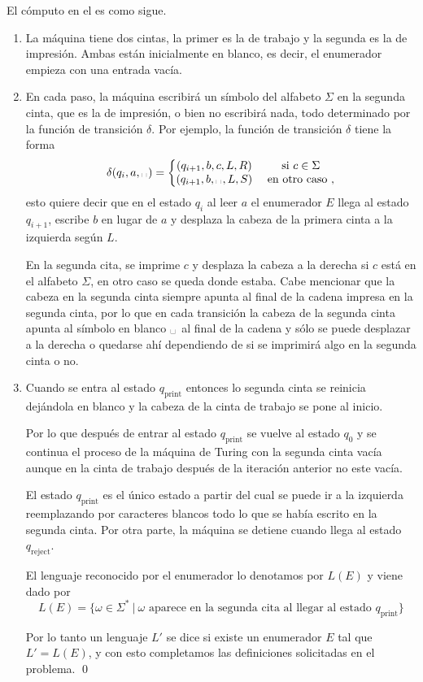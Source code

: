 \documentclass{article}
\newcommand\blank{\text{\textvisiblespace\hspace{1pt}}}
\begin{document}
El cómputo en el  es como sigue.
\begin{enumerate}
    \item La máquina tiene dos cintas, la primer es la de trabajo y la segunda es la de impresión. Ambas están inicialmente en blanco, es decir, el enumerador empieza con una entrada vacía.
    \item En cada paso, la máquina escribirá un símbolo del alfabeto $\Sigma$ en la segunda cinta, que es la de impresión, o bien no escribirá nada, todo determinado por la función de transición $\delta$. Por ejemplo, la función de transición $\delta$ tiene la forma 
    \[
        \delta(q_i,a,\blank)=\left\lbrace\begin{matrix}
                (q_{i+1},b,c,L,R) &\mbox{ si }c\in \Sigma\\ 
                (q_{i+1},b,\blank,L,S)& \mbox{ en otro caso },
        \end{matrix}\right.
    \]
    esto quiere decir que en el estado $q_i$ al leer $a$ el enumerador $E$ llega al estado $q_{i+1}$, escribe $b$ en lugar de $a$ y desplaza la cabeza de la primera cinta a la izquierda según $L$.
    
    En la segunda cita, se imprime $c$ y desplaza la cabeza a la derecha si $c$ está en el alfabeto $\Sigma$, en otro caso se queda donde estaba. Cabe mencionar que la cabeza en la segunda cinta siempre apunta al final de la cadena impresa en la segunda cinta, por lo que en cada transición la cabeza de la segunda cinta apunta al símbolo en blanco $\blank$ al final de la cadena y sólo se puede desplazar a la derecha o quedarse ahí dependiendo de si se imprimirá algo en la segunda cinta o no.
    
    \item Cuando se entra al estado $q_{\text{print}}$ entonces lo segunda cinta se reinicia dejándola en blanco y la cabeza de la cinta de trabajo se pone al inicio. 
    
    Por lo que después de entrar al estado $q_{\text{print}}$ se vuelve al estado $q_0$ y se continua el proceso de la máquina de Turing con la segunda cinta vacía aunque en la cinta de trabajo después de la iteración anterior no este vacía. 

    El estado $q_{\text{print}}$ es el único estado a partir del cual se puede ir a la izquierda reemplazando por caracteres blancos todo lo que se había escrito en la segunda cinta. Por otra parte, la máquina se detiene cuando llega al estado $q_{\text{reject}}$.
    
    El lenguaje reconocido por el enumerador lo denotamos por $L(E)$ y viene dado por 
    \[
        L(E)=\{\omega\in\Sigma^{\ast}\ |\ \omega\text{ aparece en la segunda cita al llegar al estado }q_{\text{print}}\}
    \]

    Por lo tanto un lenguaje $L'$ se dice  si existe un enumerador $E$ tal que $L'=L(E)$, y con esto completamos las definiciones solicitadas en el problema.
    \qed
\end{enumerate}
\clearpage
\end{document}
